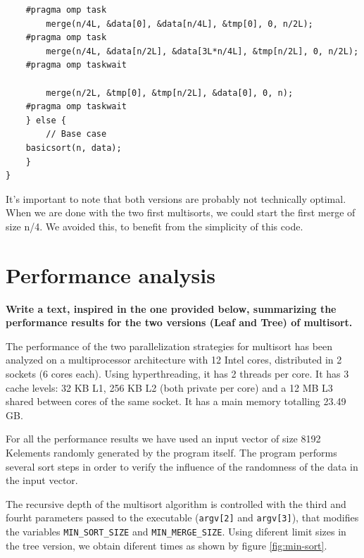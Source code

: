 \documentclass[a4paper,11pt]{article}
\begin{document}
\begin{enumerate}
\begin{verbatim}
	#pragma omp task
        merge(n/4L, &data[0], &data[n/4L], &tmp[0], 0, n/2L);
	#pragma omp task
        merge(n/4L, &data[n/2L], &data[3L*n/4L], &tmp[n/2L], 0, n/2L);
	#pragma omp taskwait

        merge(n/2L, &tmp[0], &tmp[n/2L], &data[0], 0, n);
	#pragma omp taskwait
    } else {
        // Base case
	basicsort(n, data);
    }
}
\end{verbatim}

It's important to note that both versions are probably not technically
optimal.  When we are done with the two first multisorts, we could
start the first merge of size n/4. We avoided this, to benefit from
the simplicity of this code.
\end{enumerate}

\section{Performance analysis}
\textbf{Write a text, inspired in the one provided below, summarizing
  the performance results for the two versions (Leaf and Tree) of
  multisort.}

The performance of the two parallelization strategies for multisort
has been analyzed on a multiprocessor architecture with 12 Intel
cores, distributed in 2 sockets (6 cores each). Using hyperthreading,
it has 2 threads per core. It has 3 cache levels: 32 KB L1, 256 KB L2
(both private per core) and a 12 MB L3 shared between cores of the
same socket. It has a main memory totalling 23.49 GB.

For all the performance results we have used an input vector of size
8192 Kelements randomly generated by the program itself.  The program
performs several sort steps in order to verify the influence of the
randomness of the data in the input vector.

The recursive depth of the multisort algorithm is controlled with the
third and fourht parameters passed to the executable ({\tt argv[2]}
and {\tt argv[3]}), that modifies the variables {\tt MIN\_SORT\_SIZE}
and {\tt MIN\_MERGE\_SIZE}. Using diferent limit sizes in the tree
version, we obtain diferent times as shown by figure
\ref{fig:min-sort}.
\end{document}
